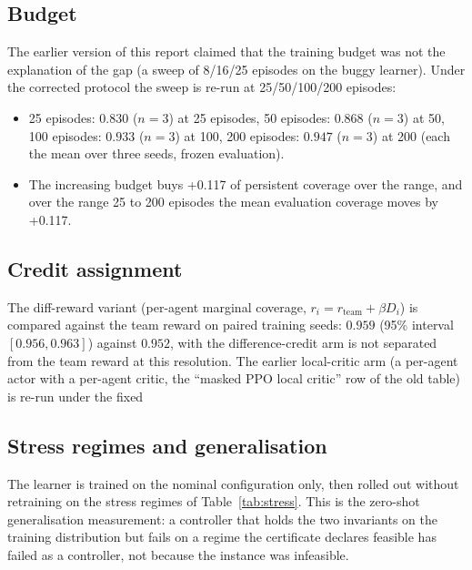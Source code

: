 \subsection{Budget}
\label{sec:results_budget}

The earlier version of this report claimed that the training budget was not
the explanation of the gap (a sweep of 8/16/25 episodes on the buggy learner).
Under the corrected protocol the sweep is re-run at 25/50/100/200 episodes:

\begin{itemize}
  \item      25 episodes: $0.830$ ($n=3$) at 25 episodes,      50 episodes: $0.868$ ($n=3$) at 50,     100 episodes: $0.933$ ($n=3$)
        at 100,     200 episodes: $0.947$ ($n=3$) at 200 (each the mean over three seeds, frozen
        evaluation).
  \item The increasing budget buys +0.117 of persistent coverage
        over the range, and over the range 25 to 200 episodes the mean evaluation coverage moves by +0.117.
\end{itemize}

\subsection{Credit assignment}
\label{sec:results_credit}

The diff-reward variant (per-agent marginal coverage, $r_i = r_{\text{team}}
+ \beta D_i$) is compared against the team reward on paired training seeds:
$0.959$ (95\% interval $[0.956, 0.963]$) against $0.952$, with the difference-credit arm is not separated from the team reward at this resolution.  The
earlier local-critic arm (a per-agent actor with a per-agent critic, the
``masked PPO local critic'' row of the old table) is re-run under the fixed

\subsection{Stress regimes and generalisation}
\label{sec:results_stress}

The learner is trained on the nominal configuration only, then rolled out
without retraining on the stress regimes of Table~\ref{tab:stress}.  This is
the zero-shot generalisation measurement: a controller that holds the two
invariants on the training distribution but fails on a regime the certificate
declares feasible has failed as a controller, not because the instance was
infeasible.


